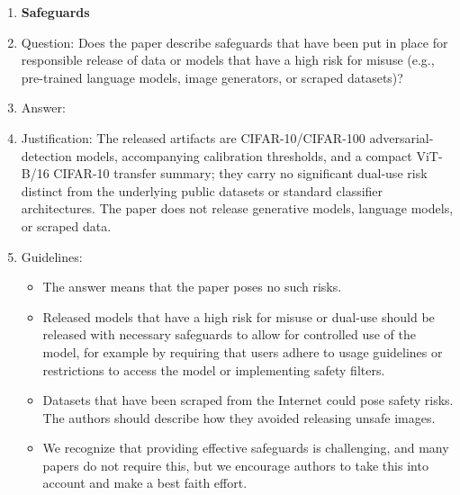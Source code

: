 \begin{enumerate}
\item {\bf Safeguards}
    \item[] Question: Does the paper describe safeguards that have been put in place for responsible release of data or models that have a high risk for misuse (e.g., pre-trained language models, image generators, or scraped datasets)?
    \item[] Answer: \answerNA{}
    \item[] Justification: The released artifacts are CIFAR-10/CIFAR-100 adversarial-detection models, accompanying calibration thresholds, and a compact ViT-B/16 CIFAR-10 transfer summary; they carry no significant dual-use risk distinct from the underlying public datasets or standard classifier architectures. The paper does not release generative models, language models, or scraped data.
    \item[] Guidelines:
    \begin{itemize}
        \item The answer \answerNA{} means that the paper poses no such risks.
        \item Released models that have a high risk for misuse or dual-use should be released with necessary safeguards to allow for controlled use of the model, for example by requiring that users adhere to usage guidelines or restrictions to access the model or implementing safety filters. 
        \item Datasets that have been scraped from the Internet could pose safety risks. The authors should describe how they avoided releasing unsafe images.
        \item We recognize that providing effective safeguards is challenging, and many papers do not require this, but we encourage authors to take this into account and make a best faith effort.
    \end{itemize}


\end{enumerate}
